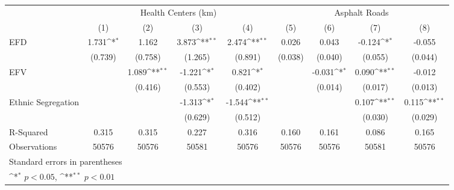 {
\def\sym#1{\ifmmode^{#1}\else\(^{#1}\)\fi}
\begin{tabular}{l*{8}{c}}
\toprule
                    &\multicolumn{4}{c}{Health Centers (km)}                                            &\multicolumn{4}{c}{Asphalt Roads}                                                  \\\cmidrule(lr){2-5}\cmidrule(lr){6-9}
                    &\multicolumn{1}{c}{(1)}        &\multicolumn{1}{c}{(2)}        &\multicolumn{1}{c}{(3)}        &\multicolumn{1}{c}{(4)}        &\multicolumn{1}{c}{(5)}        &\multicolumn{1}{c}{(6)}        &\multicolumn{1}{c}{(7)}        &\multicolumn{1}{c}{(8)}        \\
\midrule
EFD                 &       1.731\sym{*} &       1.162        &       3.873\sym{**}&       2.474\sym{**}&       0.026        &       0.043        &      -0.124\sym{*} &      -0.055        \\
                    &     (0.739)        &     (0.758)        &     (1.265)        &     (0.891)        &     (0.038)        &     (0.040)        &     (0.055)        &     (0.044)        \\
EFV                 &                    &       1.089\sym{**}&      -1.221\sym{*} &       0.821\sym{*} &                    &      -0.031\sym{*} &       0.090\sym{**}&      -0.012        \\
                    &                    &     (0.416)        &     (0.553)        &     (0.402)        &                    &     (0.014)        &     (0.017)        &     (0.013)        \\
Ethnic Segregation  &                    &                    &      -1.313\sym{*} &      -1.544\sym{**}&                    &                    &       0.107\sym{**}&       0.115\sym{**}\\
                    &                    &                    &     (0.629)        &     (0.512)        &                    &                    &     (0.030)        &     (0.029)        \\
\midrule
R-Squared           &\multicolumn{1}{c}{0.315}        &\multicolumn{1}{c}{0.315}        &\multicolumn{1}{c}{0.227}        &\multicolumn{1}{c}{0.316}        &\multicolumn{1}{c}{0.160}        &\multicolumn{1}{c}{0.161}        &\multicolumn{1}{c}{0.086}        &\multicolumn{1}{c}{0.165}        \\
Observations        &\multicolumn{1}{c}{50576}        &\multicolumn{1}{c}{50576}        &\multicolumn{1}{c}{50581}        &\multicolumn{1}{c}{50576}        &\multicolumn{1}{c}{50576}        &\multicolumn{1}{c}{50576}        &\multicolumn{1}{c}{50581}        &\multicolumn{1}{c}{50576}        \\
\bottomrule
\multicolumn{9}{l}{\footnotesize Standard errors in parentheses}\\
\multicolumn{9}{l}{\footnotesize \sym{*} \(p<0.05\), \sym{**} \(p<0.01\)}\\
\end{tabular}
}
